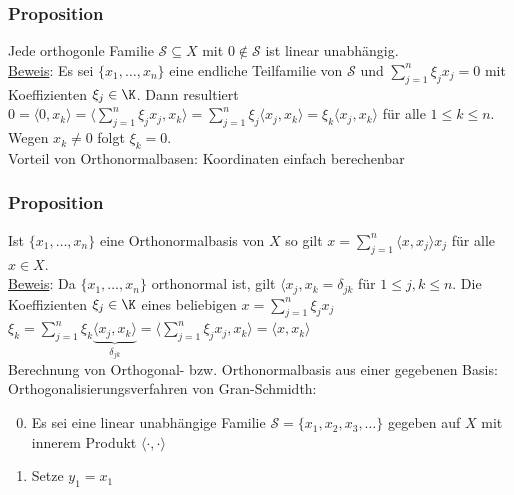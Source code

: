 \subsubsection{Proposition}
Jede orthogonle Familie $\mathcal{S}\subseteq X$ mit $0\notin\mathcal{S}$ ist linear unabhängig.\\
\underline{Beweis}: Es sei $\{x_1,\dots,x_n\}$ eine endliche Teilfamilie von $\mathcal{S}$ und $\sum_{j=1}^n \xi_j x_j =0$ mit Koeffizienten $\xi_j\in\K$.
Dann resultiert $0=\langle 0,x_k\rangle=\langle\sum_{j=1}^n\xi_j x_j,x_k\rangle=\sum_{j=1}^n \xi_j \langle x_j,x_k\rangle=\xi_k\langle x_j,x_k\rangle$ für alle $1\leq k\leq n$. Wegen $x_k\neq 0$ folgt $\xi_k=0$.\\
Vorteil von Orthonormalbasen: Koordinaten einfach berechenbar
\subsubsection{Proposition}
Ist $\{x_1,\dots,x_n\}$ eine Orthonormalbasis von $X$ so gilt $x=\sum_{j=1}^n \langle x,x_j\rangle x_j$ für alle $x\in X$.\\
\underline{Beweis}: Da $\{x_1,\dots,x_n\}$ orthonormal ist, gilt $\langle x_j,x_k=\delta_{jk}$ für $1\leq j,k\leq n$. Die Koeffizienten $\xi_j\in\K$ eines beliebigen $x=\sum_{j=1}^n\xi_j x_j$ $\xi_k=\sum_{j=1}^n\xi_k \underbrace{\langle x_j,x_k\rangle}_{\delta_{jk}}=\langle\sum_{j=1}^n\xi_j x_j,x_k\rangle=\langle x,x_k\rangle$\\
Berechnung von Orthogonal- bzw. Orthonormalbasis aus einer gegebenen Basis: Orthogonalisierungsverfahren von Gran-Schmidth:

\numbers
\begin{enumerate}
\setcounter{enumi}{-1}
\item Es sei eine linear unabhängige Familie $\mathcal{S}=\{x_1,x_2,x_3,\dots\}$ gegeben auf $X$ mit innerem Produkt $\langle \cdot,\cdot\rangle$
\item Setze $y_1=x_1$
\end{enumerate}
